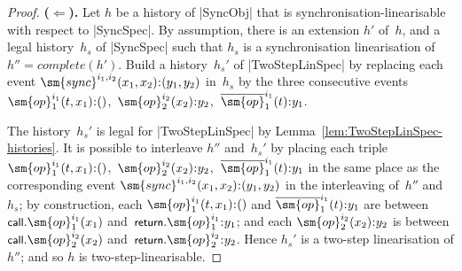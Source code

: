 \begin{proof}

\textbf{($\Leftarrow$).}\quad
%
Let $h$ be a history of |SyncObj| that is synchronisation-linearisable with
respect to |SyncSpec|.  By assumption, there is an extension $h'$ of~$h$, and
a legal history~$h_s$ of |SyncSpec| such that $h_s$ is a synchronisation
linearisation of $h'' = complete(h')$.
%
Build a history~$h_s'$ of |TwoStepLinSpec| by replacing each event
$\sm{sync}^{i_1,i_2}(x_1,x_2) \:: (y_1,y_2)$ in~$h_s$ by the three consecutive
events $\sm{op}_1^{i_1}(t,x_1) \:: ()$,\, $\sm{op}_2^{i_2}(x_2) \:: y_2$,\,
$\overline{\sm{op}}_1^{i_1}(t) \:: y_1$.

The history~$h_s'$ is legal for |TwoStepLinSpec| by
Lemma~\ref{lem:TwoStepLinSpec-histories}.
%
It is possible to interleave $h''$ and~$h_s'$ by placing each triple
$\sm{op}_1^{i_1}(t,x_1) \:: ()$,\, $\sm{op}_2^{i_2}(x_2) \:: y_2$,\,
$\overline{\sm{op}}_1^{i_1}(t) \:: y_1$ in the same place as the corresponding
event $\sm{sync}^{i_1,i_2}(x_1,x_2) \:: (y_1,y_2)$ in the interleaving
of~$h''$ and~$h_s$; by construction, each $\sm{op}_1^{i_1}(t,x_1) \:: ()$ and
$\overline{\sm{op}}_1^{i_1}(t) \:: y_1$ are between
$\call.\sm{op}_1^{i_1}(x_1)$ and~$\return.\sm{op}_1^{i_1} \:: y_1$; and each
$\sm{op}_2^{i_2}(x_2) \:: y_2$ is between $\call.\sm{op}_2^{i_2}(x_2)$
and~$\return.\sm{op}_2^{i_2} \:: y_2$.
%
Hence $h_s'$ is a two-step linearisation of $h''$; and so $h$ is
two-step-linearisable.
\end{proof}

